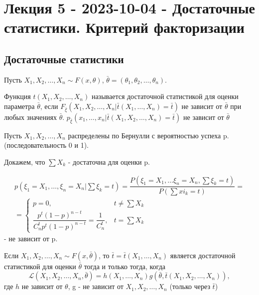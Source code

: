 \chapter{Лекция 5 - 2023-10-04 - Достаточные статистики. Критерий факторизации}

\section{Достаточные статистики}

Пусть $X_1, X_2, \dots, X_n \sim F(x, \theta)$, $\bar\theta = (\theta_1, \theta_2, \dots, \theta_n)$.

\begin{definition}
  Функция $t(X_1, X_2, \dots, X_n)$ называется достаточной статистикой для оценки параметра $\bar{\theta}$, если $F_{\bar \xi} (X_1, X_2, \dots, X_n | \bar{t} (X_1, \dots, X_n) = \bar t)$ не зависит от $\bar\theta$ при любых значениях $\bar \theta$. 
  $p_{\bar{\xi}} (x_1, \dots, x_n | \bar{t}(X_1, X_2, \dots, X_n) = \bar{t})$ не зависит от $\bar{\theta}$
\end{definition}

\begin{ex}
  Пусть $X_1, X_2, \dots, X_n$ распределены по Бернулли с вероятностью успеха p. (последовательность 0 и 1).

  Докажем, что $\sum X_k$ - достаточна для оценки p.

  \begin{multline*}
    p(\xi_1 = X_1, \dots, \xi_n = X_n | \sum \xi_k = t)
    = \dfrac{P(\xi_1 = X_1, \dots \xi_n = X_n, \sum \xi_k = t)}{P(\sum xi_k = t)} = \\
    = \begin{cases}
      p = 0, &t \neq \sum X_k \\
      \dfrac{ p^t (1-p)^{n-t} }{ C_n^t p^t (1-p)^{n-t} } = \dfrac{1}{C_n^t}, &t = \sum X_k 
    \end{cases}
  \end{multline*}
  - не зависит от p. 
\end{ex}

\begin{theorem}
  Если $X_1, X_2, \dots, X_n \sim F(x, \bar\theta)$, то $\bar t = \bar t (X_1, \dots, X_n)$ является достаточной статистикой для оценки $\bar\theta$ тогда и только тогда, когда 
  \[
    \mathcal{L}(X_1, X_2, \dots, X_n, \bar\theta) = h(X_1, \dots, X_n) g(\bar\theta, \bar t (X_1, X_2, \dots, X_n)),
  \]
  где $h$ не зависит от $\theta$, g - не зависит от $X_1, X_2, \dots, X_n$ (только через $\bar t$)
\end{theorem}

